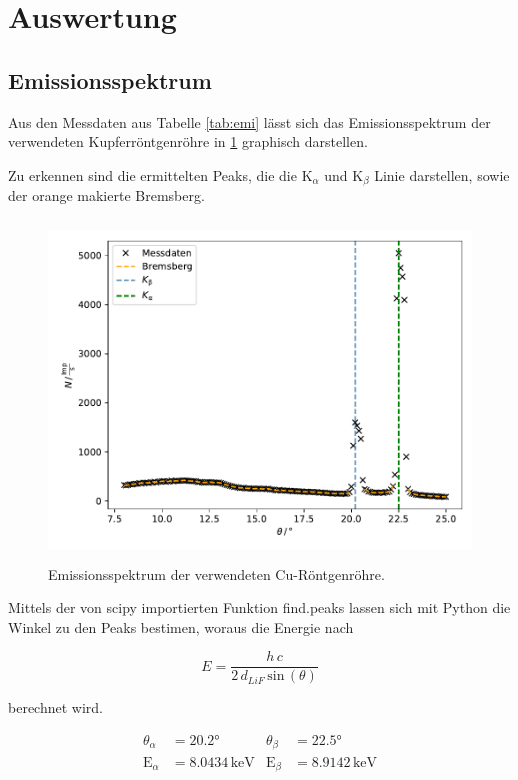 \newpage
\section{Auswertung}
\subsection{Emissionsspektrum}
\label{sub:emi}
\noindent
Aus den Messdaten aus Tabelle \ref{tab:emi} lässt sich das Emissionsspektrum der verwendeten Kupferröntgenröhre in \ref{fig:emi} graphisch darstellen.

\noindent
Zu erkennen sind die ermittelten Peaks, die die $\text{K}_\alpha$ und $\text{K}_\beta$ Linie darstellen, sowie der orange makierte Bremsberg.

\begin{figure}
    \centering
       \includegraphics[height=9cm]{daten/emissionsspektrum.pdf}
       \caption{Emissionsspektrum der verwendeten Cu-Röntgenröhre.}
       \label{fig:emi}
\end{figure}

\noindent
Mittels der von scipy \cite{scipy} importierten Funktion find.peaks lassen sich mit Python die Winkel zu den Peaks bestimen, woraus die Energie nach

\begin{equation}
    E = \frac{h \, c}{2 \, d_{LiF} \, \text{sin}\, (\theta)}
\end{equation}

\noindent
berechnet wird.

\begin{align*}
    \theta_\alpha&=20.2° & \theta_\beta&=22.5° \\
    \text{E}_\alpha&=8.0434 \, \mathrm{keV}   &\text{E}_\beta&=8.9142 \, \mathrm{keV} \\
\end{align*}


